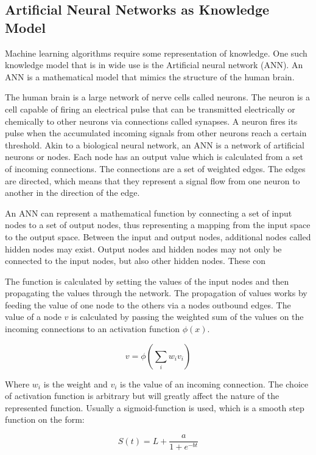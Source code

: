 \subsection{Artificial Neural Networks as Knowledge Model}
Machine learning algorithms require some representation of knowledge. One such knowledge model that is in wide use is the Artificial neural network (ANN). An ANN is a mathematical model that mimics the structure of the human brain. 

The human brain is a large network of nerve cells called neurons. The neuron is a cell capable of firing an electrical pulse that can be transmitted electrically or chemically to other neurons via connections called synapses. A neuron fires its pulse when the accumulated incoming signals from other neurons reach a certain threshold. Akin to a biological neural network, an ANN is a network of artificial neurons or nodes. Each node has an output value which is calculated from a set of incoming connections. The connections are a set of weighted edges. The edges are directed, which means that they represent a signal flow from one neuron to another in the direction of the edge.

An ANN can represent a mathematical function by connecting a set of input nodes to a set of output nodes, thus representing a mapping from the input space to the output space. Between the input and output nodes, additional nodes called hidden nodes may exist. Output nodes and hidden nodes may not only be connected to the input nodes, but also other hidden nodes. These con

The function is calculated by setting the values of the input nodes and then propagating the values through the network. The propagation of values works by feeding the value of one node to the others via a nodes outbound edges. The value of a node $v$ is calculated by passing the weighted sum of the values on the incoming connections to an activation function $\phi(x)$.

\begin{equation}
    v = \phi (\sum_i{w_i v_i})
\end{equation}

\noindent
Where $w_i$ is the weight and $v_i$ is the value of an incoming connection. The choice of activation function is arbitrary but will greatly affect the nature of the represented function. Usually a sigmoid-function is used, which is a smooth step function on the form:

\begin{equation}
    S(t) = L + \frac{a}{1 + e^{-bt}}
\end{equation}

